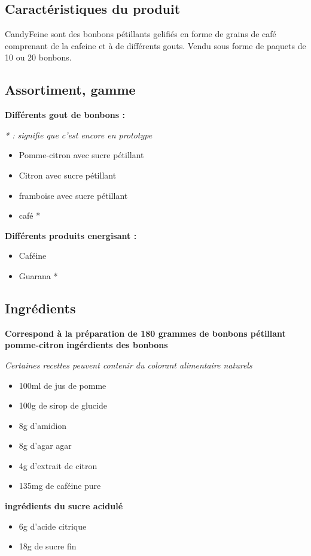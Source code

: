 \documentclass{article}
\begin{document}
\subsection{Caractéristiques du produit}
CandyFeine sont des bonbons pétillants gelifiés en forme de grains de café comprenant de la cafeine et à de différents gouts.
Vendu sous forme de paquets de 10 ou 20 bonbons.
\subsection{Assortiment, gamme}
\textbf{Différents gout de bonbons :}

\textit{* : signifie que c'est encore en prototype}
\begin{itemize}
 \item Pomme-citron avec sucre pétillant
 \item Citron avec sucre pétillant
 \item framboise avec sucre pétillant
 \item café *
\end{itemize}

\textbf{Différents produits energisant :}
\begin{itemize}
 \item Caféine
 \item Guarana *
\end{itemize}

\subsection{Ingrédients}
\textbf{Correspond à la préparation de 180 grammes de bonbons pétillant pomme-citron}
\textbf{ingérdients des bonbons}

\textit{Certaines recettes peuvent contenir du colorant alimentaire naturels}
\begin{itemize}
 \item 100ml de jus de pomme
 \item 100g de sirop de glucide
 \item 8g d'amidion
 \item 8g d'agar agar
 \item 4g d'extrait de citron
 \item 135mg de caféine pure
\end{itemize}

\textbf{ingrédients du sucre acidulé}
\begin{itemize}
 \item 6g d'acide citrique
 \item 18g de sucre fin
\end{itemize}
\end{document}
